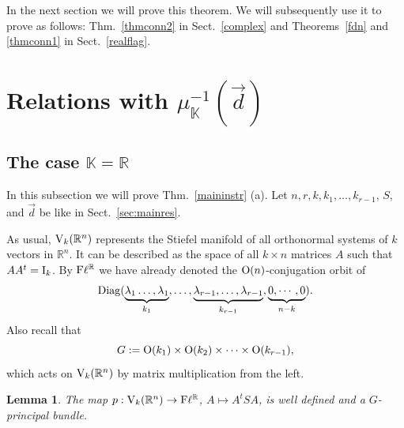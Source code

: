 \documentclass[12pt]{amsart}
\newtheorem{lem}[thm]{Lemma}
\theoremstyle{definition}
\theoremstyle{remark}
\newcommand{\RR}{\mathbb R}
\newcommand{\KK}{\mathbb K}
\begin{document}
In the next section we will prove this theorem. We will subsequently use it to prove as follows: Thm.~\ref{thmconn2} in Sect.~\ref{complex} and Theorems~\ref{fdn} and \ref{thmconn1} in Sect.~\ref{realflag}.

\section{Relations with $\mu_\KK^{-1}(\vec{d})$} \label{sec:relations}


\subsection{The case $\KK=\RR$}\label{subsec:r}

In this subsection we will prove
Thm.~\ref{maininstr} (a). 
 Let $n, r, k, k_1, \ldots, k_{r-1}$, $S$, and $\vec{d}$  be like in Sect.~\ref{sec:mainres}. 

As usual, ${\rm V}_k(\RR^n)$ represents the Stiefel manifold of all orthonormal systems of $k$ vectors in $\RR^n$. It can be described as the space of all $k\times n$ matrices $A$ such that $AA^t={\rm I}_k$. By ${\rm F}\ell^\RR$  we have already denoted the ${\rm O}(n)$-conjugation orbit of 
$${\rm Diag}(\underbrace{\lambda_1\dots, \lambda_1}_{k_1},
\dots,
\underbrace{\lambda_{r-1}, \dots, \lambda_{r-1}}_{k_{r-1}}, \underbrace{0,\cdots, 0}_{n-k}).$$
Also recall that $$G:={\rm O}(k_1) \times {\rm O}(k_2) \times \cdots \times {\rm O}(k_{r-1}),$$
which acts on ${\rm V}_k(\RR^n)$ by matrix multiplication from the left.


\begin{lem} \label{gbundle}
 The map $p:{\rm V}_k(\RR^n) \to {\rm F}\ell^\RR$, $A\mapsto A^tSA$, is well defined and a $G$-principal bundle.
\end{lem}
\end{document}
